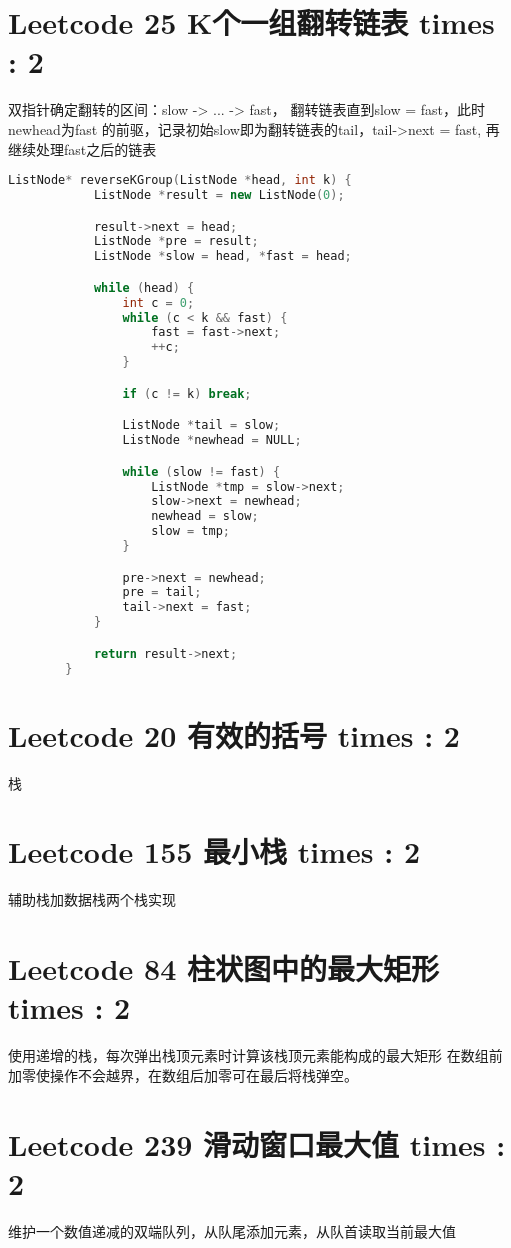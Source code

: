 \documentclass[UTF8]{ctexart}
\begin{document}
\section{Leetcode 25 K个一组翻转链表 times : 2}
双指针确定翻转的区间：slow -> ...  -> fast， 翻转链表直到slow = fast，此时newhead为fast
的前驱，记录初始slow即为翻转链表的tail，tail->next = fast, 再继续处理fast之后的链表
\begin{framed}
	\begin{lstlisting}[language=C++]
		ListNode* reverseKGroup(ListNode *head, int k) {
			ListNode *result = new ListNode(0);

			result->next = head;
			ListNode *pre = result;
			ListNode *slow = head, *fast = head;

			while (head) {
				int c = 0;
				while (c < k && fast) {
					fast = fast->next;
					++c;
				}

				if (c != k) break;

				ListNode *tail = slow;
				ListNode *newhead = NULL;

				while (slow != fast) {
					ListNode *tmp = slow->next;
					slow->next = newhead;
					newhead = slow;
					slow = tmp;
				}

				pre->next = newhead;
				pre = tail;
				tail->next = fast;
			}

			return result->next;
		}
	\end{lstlisting}
\end{framed}

\section{Leetcode 20 有效的括号 times : 2}
栈

\section{Leetcode 155 最小栈 times : 2}
辅助栈加数据栈两个栈实现

\section{Leetcode 84 柱状图中的最大矩形 times : 2}
使用递增的栈，每次弹出栈顶元素时计算该栈顶元素能构成的最大矩形
在数组前加零使操作不会越界，在数组后加零可在最后将栈弹空。

\section{Leetcode 239 滑动窗口最大值 times : 2}
维护一个数值递减的双端队列，从队尾添加元素，从队首读取当前最大值
\end{document}
